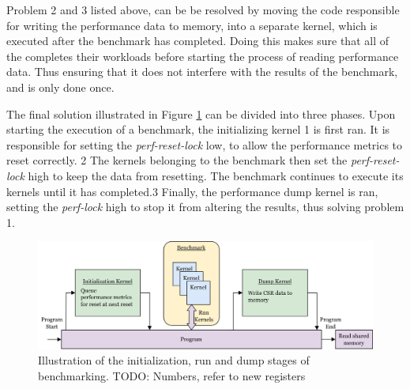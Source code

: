 Problem 2 and 3 listed above, can be be resolved by moving the code responsible for writing the performance data to memory, into a separate kernel, which is executed after the benchmark has completed. Doing this makes sure that all of the  completes their workloads before starting the process of reading performance data. Thus ensuring that it does not interfere with the results of the benchmark, and is only done once.

The final solution illustrated in Figure \ref{fig:init_run_dump} can be divided into three phases. Upon starting the execution of a benchmark, the initializing kernel \textcircled{\small{1}} is first ran. It is responsible for setting the \textit{perf-reset-lock} low, to allow the performance metrics to reset correctly. \textcircled{\small{2}} The kernels belonging to the benchmark then set the \textit{perf-reset-lock} high to keep the data from resetting. The benchmark continues to execute its kernels until it has completed.\textcircled{\small{3}} Finally, the performance dump kernel is ran, setting the \textit{perf-lock} high to stop it from altering the results, thus solving problem 1. 



\begin{figure}
    \centering
    \includegraphics[width=\textwidth]{figures/perf-kernels.png}
    \caption[Illustration of the three stages of multi-kernel benchmarking.]{Illustration of the initialization, run and dump stages of benchmarking. TODO: Numbers, refer to new registers}
    \label{fig:init_run_dump}
\end{figure}

